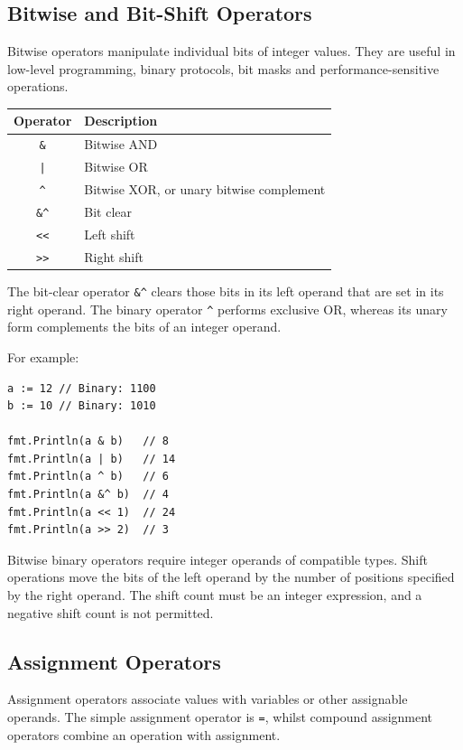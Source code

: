 \subsection{Bitwise and Bit-Shift Operators}

Bitwise operators manipulate individual bits of integer values.
They are useful in low-level programming, binary protocols,
bit masks and performance-sensitive operations.

\begin{center}
\begin{tabular}{|c|l|}
\hline
\textbf{Operator} & \textbf{Description} \\
\hline
\texttt{\&} & Bitwise AND \\
\texttt{|} & Bitwise OR \\
\texttt{\^{}} & Bitwise XOR, or unary bitwise complement \\
\texttt{\&\^} & Bit clear \\
\texttt{<<} & Left shift \\
\texttt{>>} & Right shift \\
\hline
\end{tabular}
\end{center}

The bit-clear operator \texttt{\&\^} clears those bits in its
left operand that are set in its right operand. The binary
operator \texttt{\^{}} performs exclusive OR, whereas its
unary form complements the bits of an integer operand.

For example:

\begin{lstlisting}
a := 12 // Binary: 1100
b := 10 // Binary: 1010

fmt.Println(a & b)   // 8
fmt.Println(a | b)   // 14
fmt.Println(a ^ b)   // 6
fmt.Println(a &^ b)  // 4
fmt.Println(a << 1)  // 24
fmt.Println(a >> 2)  // 3
\end{lstlisting}

Bitwise binary operators require integer operands of compatible
types. Shift operations move the bits of the left operand by
the number of positions specified by the right operand. The
shift count must be an integer expression, and a negative
shift count is not permitted.

\subsection{Assignment Operators}

Assignment operators associate values with variables or other
assignable operands. The simple assignment operator is
\texttt{=}, whilst compound assignment operators combine an
operation with assignment.

